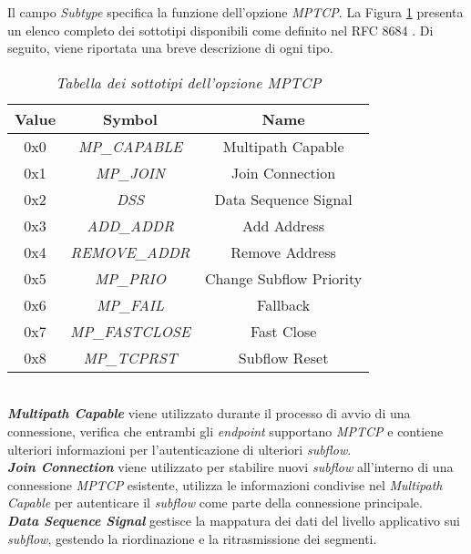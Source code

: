 \noindent Il campo \emph{Subtype} specifica la funzione dell'opzione \emph{MPTCP}. La Figura \ref{options-subtypes} presenta un elenco completo dei sottotipi disponibili come definito nel RFC 8684 \cite{site:mptcp-packet}. Di seguito, viene riportata una breve descrizione di ogni tipo.

\begin{table}[!h]
    \centering
    \begin{tabular}{|c|c|c|}
        \hline
        \textbf{Value} & \textbf{Symbol} & \textbf{Name} \\
        \hline
        0x0 & \emph{MP\_CAPABLE} & Multipath Capable \\
        \hline
        0x1 & \emph{MP\_JOIN} & Join Connection \\
        \hline
        0x2 & \emph{DSS} & Data Sequence Signal \\
        \hline
        0x3 & \emph{ADD\_ADDR} & Add Address \\
        \hline
        0x4 & \emph{REMOVE\_ADDR} & Remove Address \\
        \hline
        0x5 & \emph{MP\_PRIO} & Change Subflow Priority \\
        \hline
        0x6 & \emph{MP\_FAIL} & Fallback \\
        \hline
        0x7 & \emph{MP\_FASTCLOSE} & Fast Close \\
        \hline
        0x8 & \emph{MP\_TCPRST} & Subflow Reset \\
        \hline
    \end{tabular}
    \caption{\emph{Tabella dei sottotipi dell'opzione MPTCP}}
    \label{options-subtypes}
\end{table}
~\\
\indent \textbf{\emph{Multipath Capable}} viene utilizzato durante il processo di avvio di una connessione, verifica che entrambi gli \emph{endpoint} supportano \emph{MPTCP} e contiene ulteriori informazioni per l'autenticazione di ulteriori \emph{subflow}.
\\
\indent \textbf{\emph{Join Connection}} viene utilizzato per stabilire nuovi \emph{subflow} all'interno di una connessione \emph{MPTCP} esistente, utilizza le informazioni condivise nel \emph{Multipath Capable} per autenticare il \emph{subflow} come parte della connessione principale.
\\
\indent \textbf{\emph{Data Sequence Signal}} gestisce la mappatura dei dati del livello applicativo sui \emph{subflow}, gestendo la riordinazione e la ritrasmissione dei segmenti. 
